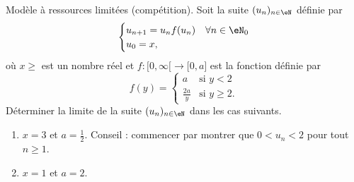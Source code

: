 
\begin{exercice}\label{exoTD3-0007}

	Modèle à ressources limitées (compétition). Soit la suite $(u_n)_{n\in\eN}$ définie par
	\begin{equation}
		\begin{cases}
			u_{n+1}=u_nf(u_n)	&	\forall n\in \eN_0\\
			u_0=x,
		\end{cases}
	\end{equation}
	où $x\geq$ est un nombre réel et $f\colon \mathopen[ 0 , \infty [\to \mathopen[ 0 , a \mathclose]$ est la fonction définie par
	\begin{equation}
		f(y)=\begin{cases}
			a	&	\text{si }y<2\\
			\frac{ 2a }{ y }	&	 \text{si }y\geq 2.
		\end{cases}
	\end{equation}
	Déterminer la limite de la suite $(u_n)_{n\in\eN}$ dans les cas suivants.
	\begin{enumerate}
		\item
			$x=3$ et $a=\frac{1}{ 2 }$. Conseil : commencer par montrer que $0<u_n<2$ pour tout $n\geq 1$.
		\item
			$x=1$ et $a=2$.
	\end{enumerate}

\end{exercice}
